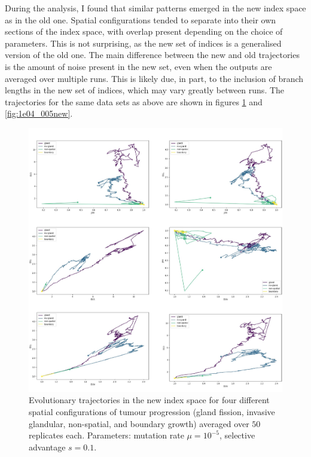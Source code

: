 During the analysis, I found that similar patterns emerged in the new index
space as in the old one. Spatial configurations tended to separate into their
own sections of the index space, with overlap present depending on the choice
of parameters. This is not surprising, as the new set of indices is a
generalised version of the old one. The main difference between the new and old
trajectories is the amount of noise present in the new set, even when the
outputs are averaged over multiple runs. This is likely due, in part, to the
inclusion of branch lengths in the new set of indices, which may vary greatly
between runs. The trajectories for the same data sets as above are shown in
figures \ref{fig:1e05_01new} and \ref{fig:1e04_005new}.

\begin{figure}[h!]
    \centering
    \includegraphics[width=\textwidth]{Chapter_3/figures/1e0501new.pdf}
    \caption{Evolutionary trajectories in the new index space for four
    different spatial configurations of tumour progression (gland fission,
    invasive glandular, non-spatial, and boundary growth) averaged over $50$
    replicates each. Parameters: mutation rate $\mu = 10^{-5}$, selective
    advantage $s = 0.1$.}
    \label{fig:1e05_01new}
\end{figure}
